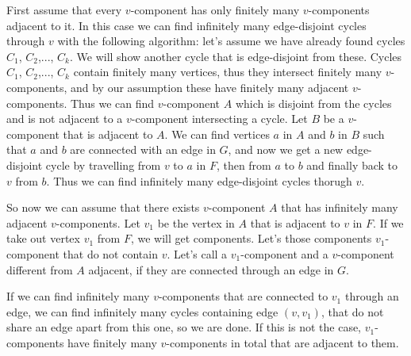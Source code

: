 \documentclass{article}
\begin{document}
First assume that every \(\displaystyle v\)-component has only finitely many \(\displaystyle v\)-components adjacent to it. In this case we can find infinitely many edge-disjoint cycles through \(\displaystyle v\) with the following algorithm: let's assume we have already found cycles \(\displaystyle C_1\), \(\displaystyle C_2\),..., \(\displaystyle C_k\). We will show another cycle that is edge-disjoint from these. Cycles \(\displaystyle C_1\), \(\displaystyle C_2\),..., \(\displaystyle C_k\) contain finitely many vertices, thus they intersect finitely many \(\displaystyle v\)-components, and by our assumption these have finitely many adjacent \(\displaystyle v\)-components. Thus we can find \(\displaystyle v\)-component \(\displaystyle A\) which is disjoint from the cycles and is not adjacent to a \(\displaystyle v\)-component intersecting a cycle. Let \(\displaystyle B\) be a \(\displaystyle v\)-component that is adjacent to \(\displaystyle A\). We can find vertices \(\displaystyle a\) in \(\displaystyle A\) and \(\displaystyle b\) in \(\displaystyle B\) such that \(\displaystyle a\) and \(\displaystyle b\) are connected with an edge in \(\displaystyle G\), and now we get a new edge-disjoint cycle by travelling from \(\displaystyle v\) to \(\displaystyle a\) in \(\displaystyle F\), then from \(\displaystyle a\) to \(\displaystyle b\) and finally back to \(\displaystyle v\) from \(\displaystyle b\). Thus we can find infinitely many edge-disjoint cycles thorugh \(\displaystyle v\).

So now we can assume that there exists \(\displaystyle v\)-component \(\displaystyle A\) that has infinitely many adjacent \(\displaystyle v\)-components. Let \(\displaystyle v_1\) be the vertex in \(\displaystyle A\) that is adjacent to \(\displaystyle v\) in \(\displaystyle F\). If we take out vertex \(\displaystyle v_1\) from \(\displaystyle F\), we will get components. Let's those components \(\displaystyle v_1\)-component that do not contain \(\displaystyle v\). Let's call a \(\displaystyle v_1\)-component and a \(\displaystyle v\)-component different from \(\displaystyle A\) adjacent, if they are connected through an edge in \(\displaystyle G\).

If we can find infinitely many \(\displaystyle v\)-components that are connected to \(\displaystyle v_1\) through an edge, we can find infinitely many cycles containing edge \(\displaystyle (v,v_1)\), that do not share an edge apart from this one, so we are done. If this is not the case, \(\displaystyle v_1\)-components have finitely many \(\displaystyle v\)-components in total that are adjacent to them.
\end{document}
